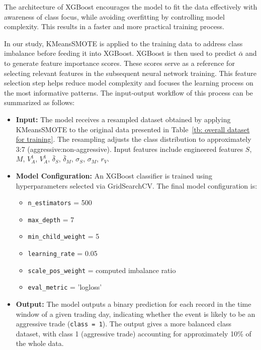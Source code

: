 The architecture of XGBoost encourages the model to fit the data effectively with awareness of class focus, while avoiding overfitting by controlling model complexity. This results in a faster and more practical training process.

In our study, KMeansSMOTE is applied to the training data to address class imbalance before feeding it into XGBoost. XGBoost is then used to predict $\bar{\alpha}$ and to generate feature importance scores. These scores serve as a reference for selecting relevant features in the subsequent neural network training. This feature selection step helps reduce model complexity and focuses the learning process on the most informative patterns. The input-output workflow of this process can be summarized as follows:
\begin{itemize}
  \item \textbf{Input:}  
  The model receives a resampled dataset obtained by applying KMeansSMOTE to the original data presented in Table~\ref{tb: overall dataset for training}. The resampling adjusts the class distribution to approximately 3:7 (aggressive:non-aggressive). Input features include engineered features $S$, $M$, $V_A^{1}$, $V_A^{1}$, $\bar{\delta}_S$, $\bar{\delta}_M$, $\sigma_S$, $\sigma_M$, $r_V$.

  \item \textbf{Model Configuration:}  
  An XGBoost classifier is trained using hyperparameters selected via GridSearchCV. The final model configuration is:
  \begin{itemize}
    \item \texttt{n\_estimators} = 500
    \item \texttt{max\_depth} = 7
    \item \texttt{min\_child\_weight} = 5
    \item \texttt{learning\_rate} = 0.05
    \item \texttt{scale\_pos\_weight} = computed imbalance ratio
    \item \texttt{eval\_metric} = 'logloss'
  \end{itemize}

  \item \textbf{Output:}  
  The model outputs a binary prediction for each record in the time window of a given trading day, indicating whether the event is likely to be an aggressive trade (\texttt{class = 1}). The output gives a more balanced class dataset, with class 1 (aggressive trade) accounting for approximately 10\% of the whole data.

\end{itemize}



